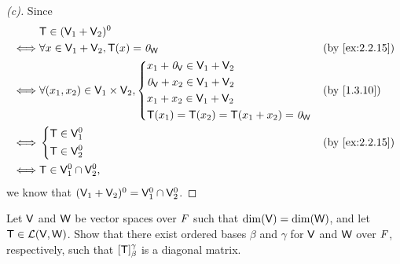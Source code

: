 \begin{proof}[(c)]
	Since
	\begin{align*}
		     & \T \in (\V_1 + \V_2)^0                                                               \\
		\iff & \forall x \in \V_1 + \V_2, \T(x) = \zv_{\W}             &  & \by{ex:2.2.15}          \\
		\iff & \forall (x_1, x_2) \in \V_1 \times \V_2, \begin{dcases}
			                                                x_1 + \zv_{\V} \in \V_1 + \V_2 \\
			                                                \zv_{\V} + x_2 \in \V_1 + \V_2 \\
			                                                x_1 + x_2 \in \V_1 + \V_2      \\
			                                                \T(x_1) = \T(x_2) = \T(x_1 + x_2) = \zv_{\W}
		                                                \end{dcases} &  & \by{1.3.10} \\
		\iff & \begin{dcases}
			       \T \in \V_1^0 \\
			       \T \in \V_2^0
		       \end{dcases}                                        &  & \by{ex:2.2.15}              \\
		\iff & \T \in \V_1^0 \cap \V_2^0,
	\end{align*}
	we know that \((\mathsf{V}_1 + \mathsf{V}_2)^0 = \mathsf{V}_1^0 \cap \mathsf{V}_2^0\).
\end{proof}

\begin{ex}\label{ex:2.2.16}
	Let \(\mathsf{V}\) and \(\mathsf{W}\) be vector spaces over \(\mathit{F}\) such that \(\dim(\mathsf{V}) = \dim(\mathsf{W})\), and let \(\mathsf{T} \in \mathcal{L}(\mathsf{V}, \mathsf{W})\).
	Show that there exist ordered bases \(\beta\) and \(\gamma\) for \(\mathsf{V}\) and \(\mathsf{W}\) over \(\mathit{F}\), respectively, such that \([\mathsf{T}]_{\beta}^{\gamma}\) is a diagonal matrix.
\end{ex}

